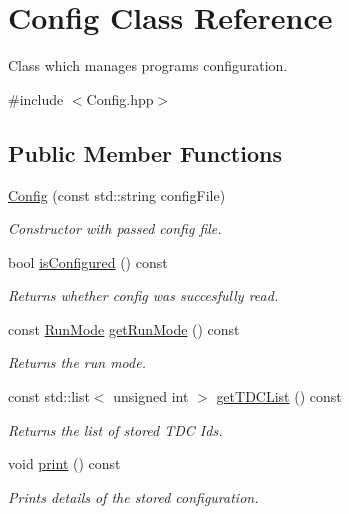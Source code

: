 \hypertarget{class_config}{}\section{Config Class Reference}
\label{class_config}


Class which manages programs configuration.  




{\ttfamily \#include $<$Config.\+hpp$>$}

\subsection*{Public Member Functions}
\begin{DoxyCompactItemize}
\item 
\hyperlink{class_config_af8b0e9dc72b16b73ebb32d177fb93e1b}{Config} (const std\+::string config\+File)
\begin{DoxyCompactList}\small\item\em Constructor with passed config file. \end{DoxyCompactList}\item 
bool \hyperlink{class_config_a47870f3f5bc52f5d0aa387c25e431055}{is\+Configured} () const
\begin{DoxyCompactList}\small\item\em Returns whether config was succesfully read. \end{DoxyCompactList}\item 
const \hyperlink{_modes_enum_8hpp_a3dfe11cf1a3a8121f6cd7fec4bf5947e}{Run\+Mode} \hyperlink{class_config_a1e69242b7f57068005d5ae195ca16530}{get\+Run\+Mode} () const
\begin{DoxyCompactList}\small\item\em Returns the run mode. \end{DoxyCompactList}\item 
const std\+::list$<$ unsigned int $>$ \hyperlink{class_config_a847bc1cf36b3d12da8590a036634a150}{get\+T\+D\+C\+List} () const
\begin{DoxyCompactList}\small\item\em Returns the list of stored T\+DC Ids. \end{DoxyCompactList}\item 
void \hyperlink{class_config_af75cb5a60c6cac9d6f6d030e65a5240a}{print} () const
\begin{DoxyCompactList}\small\item\em Prints details of the stored configuration. \end{DoxyCompactList}\end{DoxyCompactItemize}
